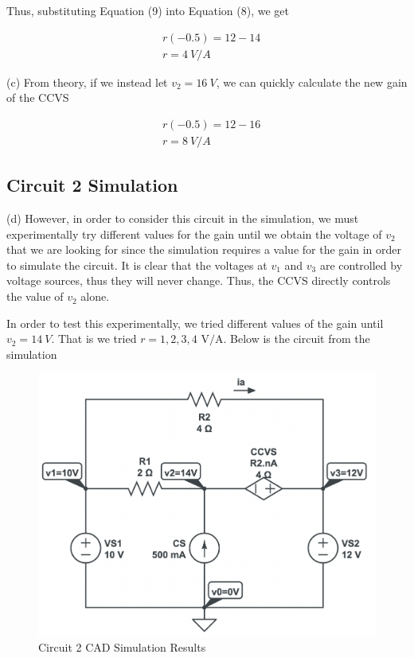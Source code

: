 \documentclass[12pt]{article}
\begin{document}
Thus, substituting Equation (9) into Equation (8), we get

\begin{equation}
    \begin{split}
        &r(-0.5) = 12 - 14 \\
        &r = \SI{4}{V/A}
    \end{split}
\end{equation}

(c) From theory, if we instead let $v_2 = \SI{16}{V}$, we can quickly calculate the new gain of the CCVS

\begin{equation}
    \begin{split}
        &r(-0.5) = 12 - 16 \\
        &r = \SI{8}{V/A}
    \end{split}
\end{equation}

\subsection{Circuit 2 Simulation}

(d) However, in order to consider this circuit in the simulation, we must experimentally try different values for the gain until we obtain the voltage of $v_2$ that we are looking for since the simulation requires a value for the gain in order to simulate the circuit. It is clear that the voltages at $v_1$ and $v_3$ are controlled by voltage sources, thus they will never change. Thus, the CCVS directly controls the value of $v_2$ alone.

In order to test this experimentally, we tried different values of the gain until $v_2 = \SI{14}{V}$. That is we tried $r = 1, 2, 3, 4 \text{ V/A}$. Below is the circuit from the simulation

\begin{figure}[H]
    \begin{center}
        \includegraphics[scale=0.5]{circuit-2-sol.png}
        \caption { Circuit 2 CAD Simulation Results}
    \end{center}
\end{figure}
\end{document}
